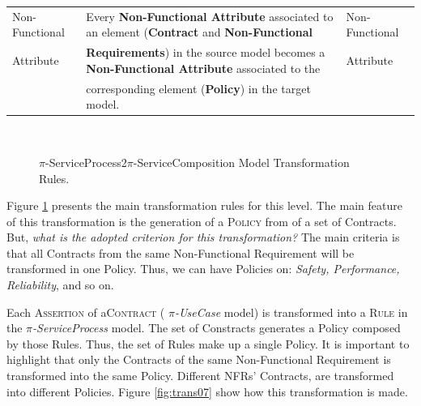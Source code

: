 \begin{table} [ht!]
\begin{tabular}{l|l|l}
	Non-Functional & Every \textbf{Non-Functional Attribute} associated to an
	element (\textbf{Contract} and \textbf{Non-Functional} &
	Non-Functional \\ Attribute &  \textbf{Requirements}) in the source model
	becomes a \textbf{Non-Functional Attribute} associated to the  &
	Attribute \\
	&corresponding element (\textbf{Policy}) in the target model. &\\
	\hline
\end{tabular}
\end{table}




\begin{figure} [ht!]
  \centering
  ~ %
  \\
  \caption{$\pi$-ServiceProcess2$\pi$-ServiceComposition Model Transformation
  Rules.}
  \label{fig:modelRulesSp2SC}
\end{figure}


Figure \ref{fig:modelRulesSp2SC} presents the main transformation rules for
this level. The main feature of this
transformation is the generation of a \textsc{Policy} from of a set of {\sc
Contracts}. But, \textit{what is the adopted criterion for this transformation?} The main criteria is that all
{\sc Contracts} from the same {\sc Non-Functional Requirement} will be
transformed in one {\sc Policy}. Thus, we can have {\sc Policies} on:
\textit{Safety, Performance, Reliability}, and so on.


Each \textsc{Assertion} of a\textsc{Contract} ( \textit{$\pi$-UseCase}
model) is transformed into a \textsc{Rule} in the \textit{$\pi$-ServiceProcess}
model. The set of {\sc Constracts} generates a {\sc Policy} composed by those
{\sc Rules}. Thus, the set of {\sc Rules} make up
a single {\sc Policy}. It is important to highlight that only the {\sc
Contracts} of the same {\sc Non-Functional Requirement} is transformed into the
same {\sc Policy}. Different NFRs' {\sc Contracts}, are transformed into
different {\sc Policies}. Figure \ref{fig:trans07} show how this transformation
is made.

